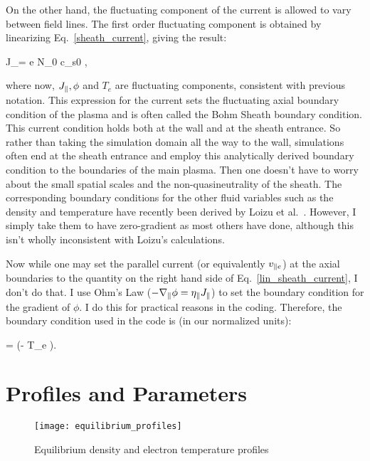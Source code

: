 On the other hand, the fluctuating component of the current is allowed to vary between field lines.
The first order fluctuating component is obtained by linearizing Eq.~\ref{sheath_current}, giving the result:

\beq
\label{lin_sheath_current}
J_\parallel = \pm e N_0 c_{s0} ,
\eeq

where now, $J_\parallel, \phi$ and $T_e$ are fluctuating components, consistent with previous notation.
This expression for the current sets the fluctuating axial boundary condition of the plasma and is often called the Bohm Sheath boundary condition. This current condition holds both at
the wall and at the sheath entrance. So rather than taking the simulation
domain all the way to the wall, simulations often end at the sheath entrance and employ this analytically derived boundary condition to the boundaries of the main plasma. 
Then one doesn't have to worry about the small spatial scales and the non-quasineutrality of the sheath.
The corresponding boundary conditions for the other fluid variables such as the density and temperature have recently been derived by Loizu et al.~\cite{loizu2012}. However, I
simply take them to have zero-gradient as most others have done, although this isn't wholly inconsistent with Loizu's calculations.

Now while one may set the parallel current (or equivalently $v_{\parallel e}$) at the axial boundaries to the quantity on the right hand side of Eq.~\ref{lin_sheath_current}, I don't do that.
I use Ohm's Law ($- \nabla_\parallel \phi = \eta_\parallel J_\parallel$) to set the boundary condition for the gradient of $\phi$. I do this for practical reasons in the coding. Therefore, the
boundary condition used in the code is (in our normalized units):

\beq
\label{sheath_bc}
\gradpar \phi = \pm {} \left(\phi - \Lambda T_e  \right).
\eeq



\section{Profiles and Parameters}
\label{s_profs_params}

\begin{figure}[!ht]
\texttt{[image: equilibrium\_profiles]}
\centering
\caption{Equilibrium density and electron temperature profiles}
\label{equilibrium_profiles}
\end{figure}


